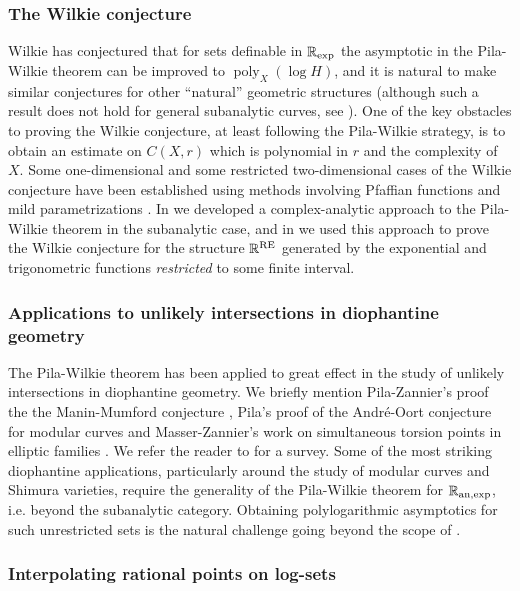 \documentclass[reqno]{amsart}
\renewcommand\~[1]{\widetilde{#1}}
\def\poly{\operatorname{poly}} \def\J{\operatorname{J}}
\def\an{{\text{an}}}
\def\RE{\mathrm{RE}}
\begin{document}
\subsubsection{The Wilkie conjecture}
Wilkie \cite{pila-wilkie} has conjectured that for sets definable in
${\mathbb R}_{\exp}$ the asymptotic in the Pila-Wilkie theorem can be improved
to $\poly_X(\log H)$, and it is natural to make similar conjectures
for other ``natural'' geometric structures (although such a result
does not hold for general subanalytic curves, see
\cite[Example~7.5]{pila:subanalytic-dilation}). One of the key
obstacles to proving the Wilkie conjecture, at least following the
Pila-Wilkie strategy, is to obtain an estimate on $C(X,r)$ which is
polynomial in $r$ and the complexity of $X$. Some one-dimensional and
some restricted two-dimensional cases of the Wilkie conjecture have
been established using methods involving Pfaffian functions and mild
parametrizations
\cite{pila:pfaff,jt:pfaff-surfaces,pila:exp-alg-surface,butler}.  In
\cite{me:analytic-interpolation} we developed a complex-analytic
approach to the Pila-Wilkie theorem in the subanalytic case, and in
\cite{me:rest-wilkie} we used this approach to prove the Wilkie
conjecture for the structure $\R^\RE$ generated by the exponential and
trigonometric functions \emph{restricted} to some finite interval.

\subsubsection{Applications to unlikely intersections in diophantine geometry}
The Pila-Wilkie theorem has been applied to great effect in the study
of unlikely intersections in diophantine geometry. We briefly mention
Pila-Zannier's proof the the Manin-Mumford conjecture
\cite{pila-zannier}, Pila's proof of the Andr\'e-Oort conjecture for
modular curves \cite{pila:andre-oort} and Masser-Zannier's work on
simultaneous torsion points in elliptic families \cite{mz:torsion}. We
refer the reader to \cite{zannier:book,scanlon:survey} for a
survey. Some of the most striking diophantine applications,
particularly around the study of modular curves and Shimura varieties,
require the generality of the Pila-Wilkie theorem for $\R_{\an,\exp}$,
i.e. beyond the subanalytic category. Obtaining polylogarithmic
asymptotics for such unrestricted sets is the natural challenge going
beyond the scope of \cite{me:rest-wilkie}.

\subsubsection{Interpolating rational points on log-sets}
\end{document}
